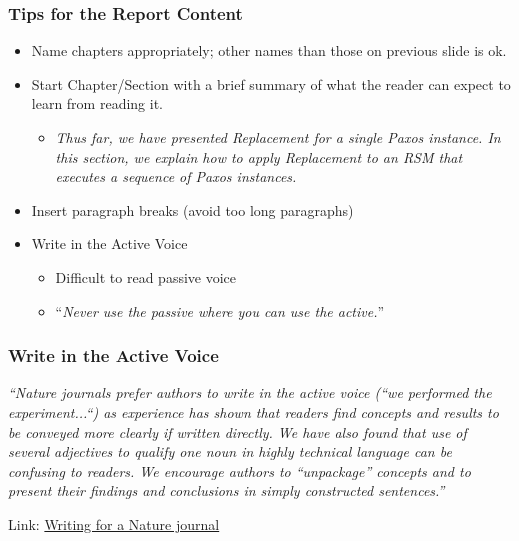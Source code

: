 \documentclass[hyperref={pdfpagelabels=false}, aspectratio=1610,handout]{beamer}
\begin{document}


\begin{frame}
\frametitle{Tips for the Report Content}
\begin{block}{}
 \begin{itemize}
  \item Name chapters appropriately; other names than those on previous slide is ok.
  \item Start Chapter/Section with a brief summary of what the reader can expect to learn from reading it.
  \begin{itemize}
   \item \emph{Thus far, we have presented Replacement for a single Paxos instance. In this section, we explain how to apply Replacement to an RSM that executes a sequence of Paxos instances.}
  \end{itemize}
  \item Insert paragraph breaks (avoid too long paragraphs)
  \item Write in the Active Voice
  \begin{itemize}
  	\item Difficult to read passive voice
	\item ``\emph{Never use the passive where you can use the active.}'' %
  \end{itemize}
 \end{itemize}
\end{block}
\end{frame}

\begin{frame}
\frametitle{Write in the Active Voice}
\begin{block}{}
\emph{``Nature journals prefer authors to write in the active voice (“we performed the experiment...“) as experience has shown that readers find concepts and results to be conveyed more clearly if written directly. We have also found that use of several adjectives to qualify one noun in highly technical language can be confusing to readers. We encourage authors to “unpackage” concepts and to present their findings and conclusions in simply constructed sentences.''}
\vspace{1cm}

\hspace{5cm} Link: \href{https://www.nature.com/authors/author_resources/how_write.html}{Writing for a Nature journal}
\end{block}
\end{frame}
\end{document}
